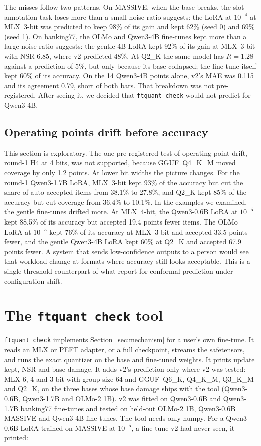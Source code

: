 \documentclass[11pt,letterpaper]{article}
\begin{document}
The misses follow two patterns. On MASSIVE, when the base breaks, the slot-annotation task loses more than a small noise ratio suggests: the LoRA at $10^{-4}$ at MLX~3-bit was predicted to keep 98\% of its gain and kept 62\% (seed 0) and 69\% (seed 1). On banking77, the OLMo and Qwen3-4B fine-tunes kept more than a large noise ratio suggests: the gentle 4B LoRA kept 92\% of its gain at MLX~3-bit with NSR 6.85, where v2 predicted 48\%. At Q2\_K the same model has $R = 1.28$ against a prediction of 5\%, but only because its base collapsed; the fine-tune itself kept 60\% of its accuracy. On the 14 Qwen3-4B points alone, v2's MAE was 0.115 and its agreement 0.79, short of both bars. That breakdown was not pre-registered. After seeing it, we decided that \texttt{ftquant check} would not predict for Qwen3-4B.

\subsection{Operating points drift before accuracy}
\label{sec:drift}

This section is exploratory. The one pre-registered test of operating-point drift, round-1 H4 at 4 bits, was not supported, because GGUF~Q4\_K\_M moved coverage by only 1.2 points. At lower bit widths the picture changes. For the round-1 Qwen3-1.7B LoRA, MLX~3-bit kept 93\% of the accuracy but cut the share of auto-accepted items from 38.1\% to 27.8\%, and Q2\_K kept 85\% of the accuracy but cut coverage from 36.4\% to 10.1\%. In the examples we examined, the gentle fine-tunes drifted more. At MLX~4-bit, the Qwen3-0.6B LoRA at $10^{-5}$ kept 88.5\% of its accuracy but accepted 19.4 points fewer items. The OLMo LoRA at $10^{-5}$ kept 76\% of its accuracy at MLX~3-bit and accepted 33.5 points fewer, and the gentle Qwen3-4B LoRA kept 60\% at Q2\_K and accepted 67.9 points fewer. A system that sends low-confidence outputs to a person would see that workload change at formats where accuracy still looks acceptable. This is a single-threshold counterpart of what \citet{zhu2026conformal} report for conformal prediction under configuration shift.

\section{The \texttt{ftquant check} tool}
\label{sec:tool}

\texttt{ftquant check} implements Section~\ref{sec:mechanism} for a user's own fine-tune. It reads an MLX or PEFT adapter, or a full checkpoint, streams the safetensors, and runs the exact quantizer on the base and fine-tuned weights. It prints update kept, NSR and base damage. It adds v2's prediction only where v2 was tested: MLX 6, 4 and 3-bit with group size 64 and GGUF~Q6\_K, Q4\_K\_M, Q3\_K\_M and Q2\_K, on the three bases whose base damage ships with the tool (Qwen3-0.6B, Qwen3-1.7B and OLMo-2 1B). v2 was fitted on Qwen3-0.6B and Qwen3-1.7B banking77 fine-tunes and tested on held-out OLMo-2 1B, Qwen3-0.6B MASSIVE and Qwen3-4B fine-tunes. The tool needs only numpy. For a Qwen3-0.6B LoRA trained on MASSIVE at $10^{-5}$, a fine-tune v2 had never seen, it printed:
\end{document}
